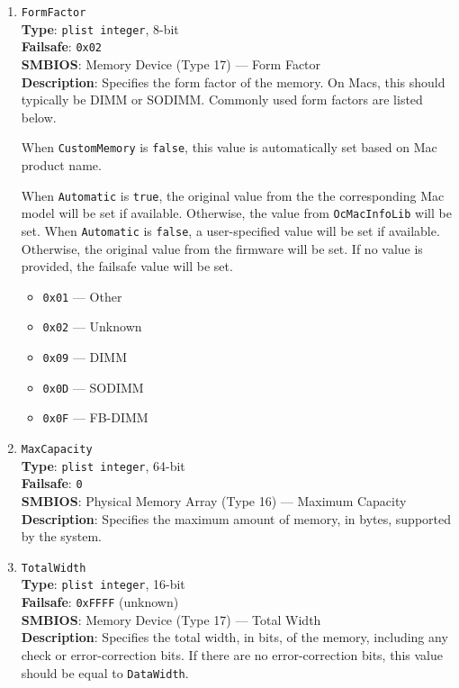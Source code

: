 \documentclass[]{article}
\providecommand{\tightlist}{%
  \setlength{\itemsep}{0pt}\setlength{\parskip}{0pt}}
\begin{document}
\begin{enumerate}
\item
  \texttt{FormFactor}\\
  \textbf{Type}: \texttt{plist\ integer}, 8-bit\\
  \textbf{Failsafe}: \texttt{0x02}\\
  \textbf{SMBIOS}: Memory Device (Type 17) --- Form Factor\\
  \textbf{Description}: Specifies the form factor of the memory.
  On Macs, this should typically be DIMM or SODIMM. Commonly used form
  factors are listed below.

  When \texttt{CustomMemory} is \texttt{false}, this value is automatically set
  based on Mac product name.

  When \texttt{Automatic} is \texttt{true}, the original value from the the corresponding Mac model will be set if available.
  Otherwise, the value from \texttt{OcMacInfoLib} will be set.
  When \texttt{Automatic} is \texttt{false}, a user-specified value will be set if available.
  Otherwise, the original value from the firmware will be set.
  If no value is provided, the failsafe value will be set.

  \begin{itemize}
  \tightlist
  \item
    \texttt{0x01} --- Other
  \item
    \texttt{0x02} --- Unknown
  \item
    \texttt{0x09} --- DIMM
  \item
    \texttt{0x0D} --- SODIMM
  \item
    \texttt{0x0F} --- FB-DIMM
  \end{itemize}

\item
  \texttt{MaxCapacity}\\
  \textbf{Type}: \texttt{plist\ integer}, 64-bit\\
  \textbf{Failsafe}: \texttt{0}\\
  \textbf{SMBIOS}: Physical Memory Array (Type 16) --- Maximum Capacity\\
  \textbf{Description}: Specifies the maximum amount of memory, in bytes,
  supported by the system.

\item
  \texttt{TotalWidth}\\
  \textbf{Type}: \texttt{plist\ integer}, 16-bit\\
  \textbf{Failsafe}: \texttt{0xFFFF} (unknown)\\
  \textbf{SMBIOS}: Memory Device (Type 17) --- Total Width\\
  \textbf{Description}: Specifies the total width, in bits, of the
  memory, including any check or error-correction bits. If there are
  no error-correction bits, this value should be equal to \texttt{DataWidth}.


\end{enumerate}
\end{document}
